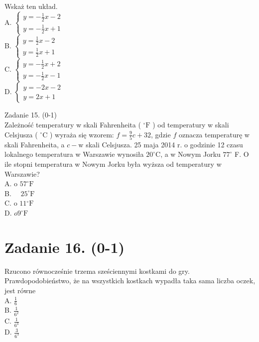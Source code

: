 \documentclass[10pt]{article}
\begin{document}
Wskaż ten układ.\\
A. \(\left\{\begin{array}{l}y=-\frac{1}{2} x-2 \\ y=-\frac{1}{2} x+1\end{array}\right.\)\\
B. \(\left\{\begin{array}{l}y=\frac{1}{2} x-2 \\ y=\frac{1}{2} x+1\end{array}\right.\)\\
C. \(\left\{\begin{array}{l}y=-\frac{1}{2} x+2 \\ y=-\frac{1}{2} x-1\end{array}\right.\)\\
D. \(\left\{\begin{array}{l}y=-2 x-2 \\ y=2 x+1\end{array}\right.\)

Zadanie 15. (0-1)\\
Zależność temperatury w skali Fahrenheita ( \({ }^{\circ} \mathrm{F}\) ) od temperatury w skali Celsjusza ( \({ }^{\circ} \mathrm{C}\) ) wyraża się wzorem: \(f=\frac{9}{5} c+32\), gdzie \(f\) oznacza temperaturę w skali Fahrenheita, a \(c-\mathrm{w}\) skali Celsjusza. 25 maja 2014 r. o godzinie 12 czasu lokalnego temperatura w Warszawie wynosiła \(20^{\circ} \mathrm{C}\), a w Nowym Jorku \(77^{\circ}\) F. O ile stopni temperatura w Nowym Jorku była wyższa od temperatury w Warszawie?\\
A. o \(57^{\circ} \mathrm{F}\)\\
B. \(\quad 25^{\circ} \mathrm{F}\)\\
C. o \(11{ }^{\circ} \mathrm{F}\)\\
D. \(o 9^{\circ} \mathrm{F}\)

\section*{Zadanie 16. (0-1)}
Rzucono równocześnie trzema sześciennymi kostkami do gry. Prawdopodobieństwo, że na wszystkich kostkach wypadła taka sama liczba oczek, jest równe\\
A. \(\frac{1}{6}\)\\
B. \(\frac{1}{6^{2}}\)\\
C. \(\frac{1}{6^{3}}\)\\
D. \(\frac{3}{6^{3}}\)
\end{document}
